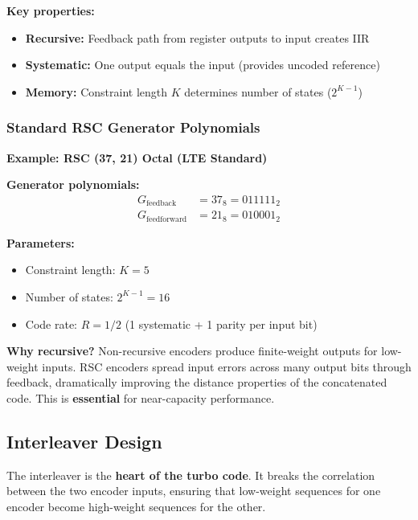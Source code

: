 \textbf{Key properties:}
\begin{itemize}
\item \textbf{Recursive:} Feedback path from register outputs to input creates IIR
\item \textbf{Systematic:} One output equals the input (provides uncoded reference)
\item \textbf{Memory:} Constraint length $K$ determines number of states ($2^{K-1}$)
\end{itemize}

\subsubsection{Standard RSC Generator Polynomials}

\textbf{Example: RSC (37, 21) Octal (LTE Standard)}

\textbf{Generator polynomials:}
\begin{equation}
\begin{aligned}
G_{\text{feedback}} &= 37_8 = 011111_2 \\
G_{\text{feedforward}} &= 21_8 = 010001_2
\end{aligned}
\end{equation}

\textbf{Parameters:}
\begin{itemize}
\item Constraint length: $K = 5$
\item Number of states: $2^{K-1} = 16$
\item Code rate: $R = 1/2$ (1 systematic + 1 parity per input bit)
\end{itemize}

\begin{warningbox}
\textbf{Why recursive?} Non-recursive encoders produce finite-weight outputs for low-weight inputs. RSC encoders spread input errors across many output bits through feedback, dramatically improving the distance properties of the concatenated code. This is \textbf{essential} for near-capacity performance.
\end{warningbox}

\subsection{Interleaver Design}

The interleaver is the \textbf{heart of the turbo code}. It breaks the correlation between the two encoder inputs, ensuring that low-weight sequences for one encoder become high-weight sequences for the other.

